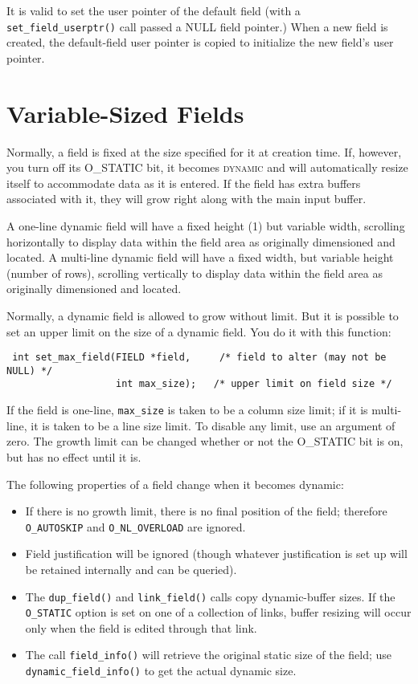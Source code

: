 It is valid to set the user pointer of the default field (with a
\texttt{set\_field\_userptr()} call passed a NULL field pointer.)
When a new field is created, the default-field user pointer is copied
to initialize the new field's user pointer.

\section{Variable-Sized Fields}

\label{f0:fdynamic}Normally, a field is fixed at the size specified for it at creation
time.  If, however, you turn off its O\_STATIC bit, it becomes
\textsc{dynamic} and will automatically resize itself to accommodate
data as it is entered.  If the field has extra buffers associated with it,
they will grow right along with the main input buffer.  

A one-line dynamic field will have a fixed height (1) but variable
width, scrolling horizontally to display data within the field area as
originally dimensioned and located.  A multi-line dynamic field will
have a fixed width, but variable height (number of rows), scrolling
vertically to display data within the field area as originally
dimensioned and located. 

Normally, a dynamic field is allowed to grow without limit.  But it is
possible to set an upper limit on the size of a dynamic field.  You do
it with this function:
\begin{verbatim} int set_max_field(FIELD *field,     /* field to alter (may not be NULL) */
                   int max_size);   /* upper limit on field size */
\end{verbatim}
If the field is one-line, \texttt{max\_size} is taken to be a column size
limit; if it is multi-line, it is taken to be a line size limit.  To disable
any limit, use an argument of zero.  The growth limit can be changed whether
or not the O\_STATIC bit is on, but has no effect until it is. 

The following properties of a field change when it becomes dynamic:
\begin{itemize}
\item If there is no growth limit, there is no final position of the field;
therefore \texttt{O\_AUTOSKIP} and \texttt{O\_NL\_OVERLOAD} are ignored.
\item Field justification will be ignored (though whatever justification is
set up will be retained internally and can be queried).
\item The \texttt{dup\_field()} and \texttt{link\_field()} calls copy
dynamic-buffer sizes.  If the \texttt{O\_STATIC} option is set on one of a
collection of links, buffer resizing will occur only when the field is
edited through that link.
\item The call \texttt{field\_info()} will retrieve the original static size of
the field; use \texttt{dynamic\_field\_info()} to get the actual dynamic size.
\end{itemize}

